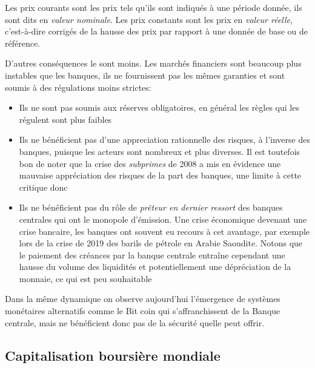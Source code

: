 \documentclass[main.tex]{subfiles}
\begin{document}
\begin{definition}
        Les prix courants sont les prix tels qu'ils sont indiqués à une période donnée, ils sont dits en \emph{valeur nominale}.
        Les prix constants sont les prix en \emph{valeur réelle}, c'est-à-dire corrigés de la hausse des prix par rapport à une donnée de base ou de référence. 
\end{definition}

D'autres conséquences le sont moins. Les marchés financiers sont beaucoup plus instables que les banques, ils ne fournissent pas les mêmes garanties et sont soumis à des régulations moins strictes:
\begin{itemize}
        \item Ils ne sont pas soumis aux réserves obligatoires, en général les règles qui les régulent sont plus faibles
        \item Ils ne bénéficient pas d'une appreciation rationnelle des risques, à l'inverse des banques, puisque les acteurs sont nombreux et plus diverses. Il est toutefois bon de noter que la crise des \emph{subprimes} de 2008 a mis en évidence une mauvaise appréciation des risques de la part des banques, une limite à cette critique donc
        \item Ils ne bénéficient pas du rôle de \emph{prêteur en dernier ressort} des banques centrales qui ont le monopole d'émission. Une crise économique devenant une crise bancaire, les banques ont souvent eu recours à cet avantage, par exemple lors de la crise de 2019 des barils de pétrole en Arabie Saoudite. Notons que le paiement des créances par la banque centrale entraîne cependant une hausse du volume des liquidités et potentiellement une dépréciation de la monnaie, ce qui est peu souhaitable
\end{itemize}


Dans la même dynamique on observe aujourd'hui l'émergence de systèmes monétaires alternatifs comme le Bit coin qui s'affranchissent de la Banque centrale, mais ne bénéficient donc pas de la sécurité quelle peut offrir.


\subsection{Capitalisation boursière mondiale}
\end{document}

